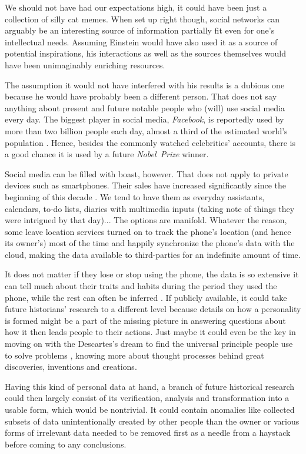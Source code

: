 We should not have had our expectations high, it could have been just a collection of silly cat memes. When set up right though, social networks can arguably be an interesting source of information partially fit even for one's intellectual needs. Assuming Einstein would have also used it as a source of potential inspirations, his interactions as well as the sources themselves would have been unimaginably enriching resources.

The assumption it would not have interfered with his results is a dubious one because he would have probably been a different person. That does not say anything about present and future notable people who (will) use social media every day.
The biggest player in social media, \textit{Facebook}, is reportedly used by more than two billion people each day, almost a third of the estimated world's population \cite{facebook, wp}. Hence, besides the commonly watched celebrities' accounts, there is a good chance it is used by a future \emph{Nobel~Prize} winner.

Social media can be filled with boast, however. That does not apply to private devices such as smartphones. Their sales have increased significantly since the beginning of this decade \cite{statista2}. We tend to have them as everyday assistants, calendars, to-do lists, diaries with multimedia inputs (taking note of things they were intrigued by that day)...  The options are manifold.
Whatever the reason, some leave location services turned on to track the phone's location (and hence its owner's) most of the time and happily synchronize the phone's data with the cloud, making the data  available to third-parties for an indefinite amount of time.

It does not matter if they lose or stop using the phone, the data is so extensive it can tell much about their traits and habits during the period they used the phone, while the rest can often be inferred \cite{quattrone}. If publicly available, it could take future historians' research to a different level because details on how a personality is formed might be a part of the missing picture in answering questions about how it then leads people to their actions.
Just maybe it could even be the key in moving on with the Descartes's dream to find the universal principle people use to solve problems \cite{polya}, knowing more about thought processes behind great discoveries, inventions and creations.

Having this kind of personal data at hand, a branch of future historical research could then largely consist of its verification, analysis and transformation into a usable form, which would be nontrivial.
It could contain anomalies like collected subsets of data unintentionally created by other people than the owner or various forms of irrelevant data needed to be removed first as a needle from a haystack before coming to any conclusions.

